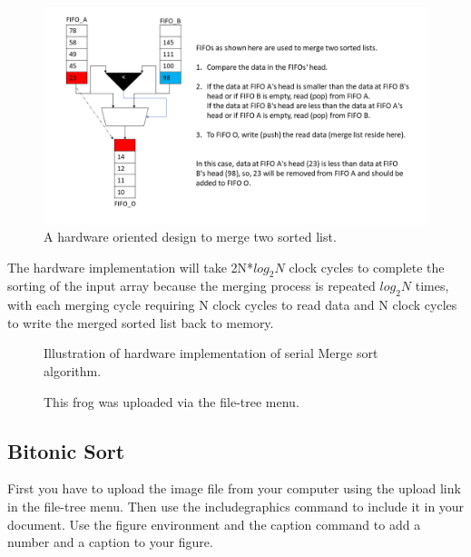 \documentclass{article}
\begin{document}
\begin{figure}[H]
\centering
\includegraphics[width=1.00\textwidth]{fifo_nwk.PNG}
\caption{\label{fig:fifo_nwk}A hardware oriented design to merge two sorted list.}
\end{figure}


The hardware implementation will take 2N*$log_2N$ clock cycles to complete the sorting of the input array because the merging process is repeated $log_2N$ times, with each merging cycle requiring N clock cycles to read data and N clock cycles to write the merged sorted list back to memory.


\begin{figure}[H]
\centering
\caption{\label{fig:address_serial}Illustration of hardware implementation of serial Merge sort algorithm.}
\end{figure}


\begin{figure}[H]
\centering

\caption{\label{fig:serial}This frog was uploaded via the file-tree menu.}
\end{figure}

\subsection{Bitonic Sort}

First you have to upload the image file from your computer using the upload link in the file-tree menu. Then use the includegraphics command to include it in your document. Use the figure environment and the caption command to add a number and a caption to your figure. %
\end{document}
